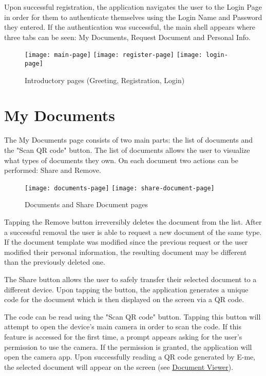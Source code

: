 		Upon successful registration, the application navigates the user to the Login Page in order for them to authenticate themselves using the Login Name and Password they entered.
		If the authentication was successful, the main shell appears where three tabs can be seen: My Documents, Request Document and Personal Info.

		\begin{figure}[H]
			\centering
			\texttt{[image: main-page]}				
			\texttt{[image: register-page]}			
			\texttt{[image: login-page]}				
			\caption{Introductory pages (Greeting, Registration, Login)}
		\end{figure}

	\section{My Documents}\label{documents}
	The My Documents page consists of two main parts: the list of documents and the "Scan QR code" button.
	The list of documents allows the user to visualize what types of documents they own.
	On each document two actions can be performed: Share and Remove.

		\begin{figure}[H]
			\centering
			\texttt{[image: documents-page]}				
			\texttt{[image: share-document-page]}
			\caption{Documents and Share Document pages}
		\end{figure}

		Tapping the Remove button irreversibly deletes the document from the list.
		After a successful removal the user is able to request a new document of the same type.
		If the document template was modified since
		the previous request or the user modified their personal information, the resulting document may be different than the previously deleted one.

		The Share button allows the user to safely transfer their selected document to a different device.
		Upon tapping the button, the application generates a unique code for the document which is then displayed on the screen via a QR code.

		The code can be read using the "Scan QR code" button. 
		Tapping this button will attempt to open the device's main camera in order to scan the code.
		If this feature is accessed for the first time, a prompt appears asking for the user's permission to use the camera.
		If the permission is granted, the application will open the camera app. 
		Upon successfully reading a QR code generated by E-me, the selected document will appear on the screen (see \hyperref[document]{Document Viewer}).


